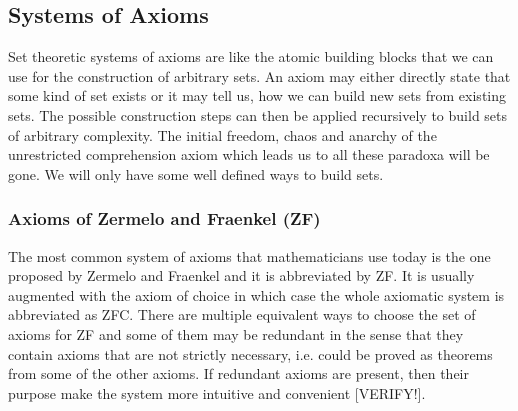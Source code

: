 



\subsection{Systems of Axioms}
Set theoretic systems of axioms are like the atomic building blocks that we can use for the construction of arbitrary sets. An axiom may either directly state that some kind of set exists or it may tell us, how we can build new sets from existing sets. The possible construction steps can then be applied recursively to build sets of arbitrary complexity. The initial freedom, chaos and anarchy of the unrestricted comprehension axiom which leads us to all these paradoxa will be gone. We will only have some well defined ways to build sets.

\subsubsection{Axioms of Zermelo and Fraenkel (ZF)}
The most common system of axioms that mathematicians use today is the one proposed by Zermelo and Fraenkel and it is abbreviated by ZF. It is usually augmented with the axiom of choice in which case the whole axiomatic system is abbreviated as ZFC. There are multiple equivalent ways to choose the set of axioms for ZF and some of them may be redundant in the sense that they contain axioms that are not strictly necessary, i.e. could be proved as theorems from some of the other axioms. If redundant axioms are present, then their purpose make the system more intuitive and convenient [VERIFY!].





